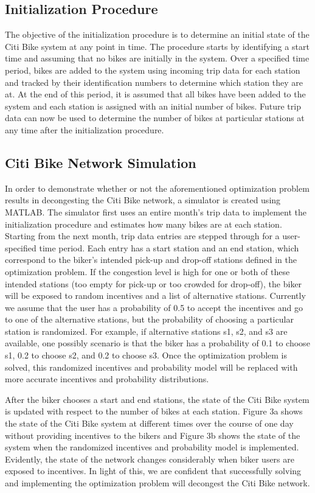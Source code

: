 \documentclass[times, 10pt,twocolumn]{article}
\begin{document}
\subsection{Initialization Procedure}
The objective of the initialization procedure is to determine an initial state of the Citi Bike system at any point in time. The procedure starts by identifying a start time and assuming that no bikes are initially in the system. Over a specified time period, bikes are added to the system using incoming trip data for each station and tracked by their identification numbers to determine which station they are at. At the end of this period, it is assumed that all bikes have been added to the system and each station is assigned with an initial number of bikes. Future trip data can now be used to determine the number of bikes at particular stations at any time after the initialization procedure.

\subsection{Citi Bike Network Simulation}

In order to demonstrate whether or not the aforementioned optimization problem results in decongesting the Citi Bike network, a simulator is created using MATLAB. The simulator first uses an entire month's trip data to implement the initialization procedure and estimates how many bikes are at each station. Starting from the next month, trip data entries are stepped through for a user-specified time period. Each entry has a start station and an end station, which correspond to the biker's intended pick-up and drop-off stations defined in the optimization problem. If the congestion level is high for one or both of these intended stations (too empty for pick-up or too crowded for drop-off), the biker will be exposed to random incentives and a list of alternative stations. Currently we assume that the user has a probability of 0.5 to accept the incentives and go to one of the alternative stations, but the probability of choosing a particular station is randomized. For example, if alternative stations s1, s2, and s3 are available, one possibly scenario is that the biker has a probability of 0.1 to choose s1, 0.2 to choose s2, and 0.2 to choose s3. Once the optimization problem is solved, this randomized incentives and probability model will be replaced with more accurate incentives and probability distributions.

After the biker chooses a start and end stations, the state of the Citi Bike system is updated with respect to the number of bikes at each station. Figure 3a shows the state of the Citi Bike system at different times over the course of one day without providing incentives to the bikers and Figure 3b shows the state of the system when the randomized incentives and probability model is implemented. Evidently, the state of the network changes considerably when biker users are exposed to incentives. In light of this, we are confident that successfully solving and implementing the optimization problem will decongest the Citi Bike network.
\end{document}
